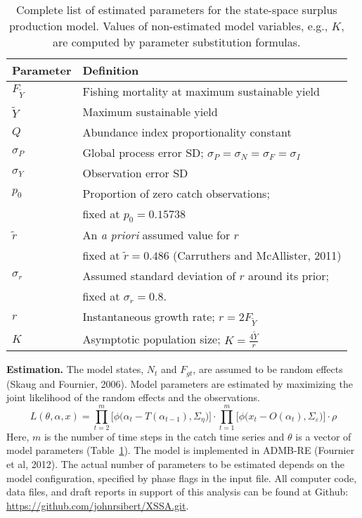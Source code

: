 \documentclass[12pt,letterpaper]{article}
\newcommand\MSY{\widetilde{Y}}
\newcommand\Fmsy{F_{\MSY}}
\begin{document}
\begin{table}
\caption{Complete list of estimated parameters for 
the state-space surplus production model.
Values of non-estimated model variables, e.g., $K$, are computed by
parameter substitution formulas.}
\label{tab:allvars1}
\begin{center}
\begin{tabular}{ll}
\hline
Parameter & Definition\\
\hline
\hline
$\Fmsy$& Fishing mortality at maximum sustainable yield\\
$\MSY$ & Maximum sustainable yield\\
$Q$    & Abundance index proportionality constant\\
$\sigma_P$ & Global process error SD; $\sigma_P=\sigma_N=\sigma_F=\sigma_I$\\
$\sigma_Y$ & Observation error SD \\
\hline
$p_0$  & Proportion of zero catch observations;\\
       & fixed at $p_0 = 0.15738$\\
$\tilde{r}$ & An {\it a priori} assumed value for $r$\\
            & fixed at $\tilde{r}=0.486$ (Carruthers and McAllister, 2011)\\
$\sigma_r$  & Assumed standard deviation of $r$ around its prior;\\
            & fixed at $\sigma_r=0.8$.\\
\hline
$r$    & Instantaneous growth rate; $r=2F_{\MSY}$\\
$K$    & Asymptotic population size; $K=\frac{4\MSY}{r}$\\
\hline
\end{tabular}
\end{center}
\end{table}



{\bf Estimation.} The model states, $N_t$ and $F_{gt}$, are assumed to be random
effects (Skaug and Fournier, 2006). Model parameters are estimated by
maximizing the joint likelihood of the random
effects and the observations.
\begin{equation}
\label{eqn:likelihood}
L(\theta,\alpha,x)=
\prod^m_{t=2}\big[\phi\big(\alpha_t-T(\alpha_{t-1}), \Sigma_\eta\big)\big]\cdot
\prod^m_{t=1}\big[\phi\big(x_t-O(\alpha_t),
\Sigma_\varepsilon\big)\big]\cdot\rho
\end{equation}
Here, $m$ is the number of time steps in the catch time series and
$\theta$ is a vector of model parameters (Table~\ref{tab:allvars1}).
The model is implemented in ADMB-RE (Fournier et al, 2012).
The actual number of
parameters to be estimated depends on the model configuration,
specified by phase flags in the input file. 
All computer code, data files, and draft reports in support of this
analysis can be found at Github:
\url{https://github.com/johnrsibert/XSSA.git}.
\end{document}
